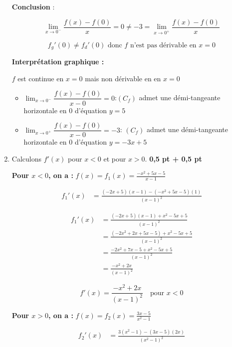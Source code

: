 \documentclass[12pt,a4paper]{article}
\begin{document}
\begin{enumerate}
\textbf{Conclusion} :

\[
\lim_{x \to 0^-} \frac{f(x) - f(0)}{x} = 0 \neq -3 = \lim_{x \to 0^+} \frac{f(x) - f(0)}{x}
\]

\begin{resultbox}
\[
\boxed{f_{g}'(0)\neq f_{d}'(0) \text{ donc }  f \text{ n’est pas dérivable en } x = 0}
\]
\end{resultbox}

\textbf{Interprétation graphique :}

\( f \) est continue en \( x = 0 \) mais non dérivable en en \( x = 0 \)

\begin{itemize}
 \item \( \lim_{x \to 0^-}\dfrac{f(x) - f(0)}{x - 0} = 0 \):\( (C_f) \) admet une démi-tangeante horizontale en \( 0\) d'équation \( y = 5 \)
 \item \( \lim_{x \to 0^+}\dfrac{f(x) - f(0)}{x - 0} = -3 \): \( (C_f) \) admet une démi-tangeante horizontale en \( 0 \) d'équation \( y = -3x + 5\)
\end{itemize} 
    
    
    \item Calculons \( f'(x) \) pour \( x < 0 \) et pour \( x > 0 \). \hfill \textbf{0{,}5 pt + 0{,}5 pt}

\textbf{Pour \( x < 0 \), on a :} \( f(x) = f_1(x) = \frac{-x^2 + 5x - 5}{x - 1} \)

\[
\begin{aligned}
f_1'(x) &= \frac{(-2x + 5)(x - 1) - (-x^2 + 5x - 5)(1)}{(x - 1)^2}
\end{aligned}
\]

\[
\begin{aligned}
f_1'(x) &= \frac{(-2x + 5)(x - 1) + x^2 - 5x + 5}{(x - 1)^2} \\
&= \frac{(-2x^2 + 2x + 5x - 5) + x^2 - 5x + 5}{(x - 1)^2} \\
&= \frac{-2x^2 + 7x - 5 + x^2 - 5x + 5}{(x - 1)^2} \\
&= \frac{-x^2 + 2x}{(x - 1)^2}
\end{aligned}
\]

\[
\boxed{f'(x) = \dfrac{-x^2 + 2x}{(x - 1)^2} \quad \text{pour } x < 0}
\]

\bigskip

\textbf{Pour \( x > 0 \), on a :} \( f(x) = f_2(x) = \frac{3x - 5}{x^2 - 1} \)

\[
\begin{aligned}
f_2'(x) &= \frac{3(x^2 - 1) - (3x - 5)(2x)}{(x^2 - 1)^2}
\end{aligned}
\]


\end{enumerate}
\end{document}
